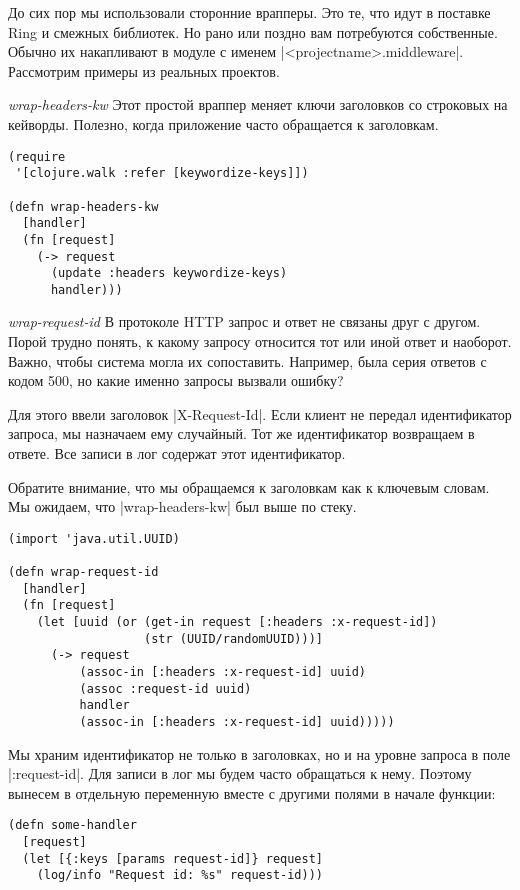 До сих пор мы использовали сторонние врапперы. Это те, что идут в поставке Ring
и смежных библиотек. Но рано или поздно вам потребуются собственные. Обычно их
накапливают в модуле с именем \spverb|<projectname>.middleware|. Рассмотрим примеры из
реальных проектов.

\emph{wrap-headers-kw} Этот простой враппер меняет ключи заголовков со строковых
на кейворды. Полезно, когда приложение часто обращается к заголовкам.

\begin{verbatim}
(require
 '[clojure.walk :refer [keywordize-keys]])

(defn wrap-headers-kw
  [handler]
  (fn [request]
    (-> request
      (update :headers keywordize-keys)
      handler)))
\end{verbatim}



\emph{wrap-request-id} В протоколе HTTP запрос и ответ не связаны друг с
другом. Порой трудно понять, к какому запросу относится тот или иной ответ и
наоборот. Важно, чтобы система могла их сопоставить. Например, была серия
ответов с кодом 500, но какие именно запросы вызвали ошибку?

Для этого ввели заголовок \spverb|X-Request-Id|. Если клиент не передал идентификатор
запроса, мы назначаем ему случайный. Тот же идентификатор возвращаем в
ответе. Все записи в лог содержат этот идентификатор.

Обратите внимание, что мы обращаемся к заголовкам как к ключевым словам. Мы
ожидаем, что \spverb|wrap-headers-kw| был выше по стеку.

\begin{verbatim}
(import 'java.util.UUID)

(defn wrap-request-id
  [handler]
  (fn [request]
    (let [uuid (or (get-in request [:headers :x-request-id])
                   (str (UUID/randomUUID)))]
      (-> request
          (assoc-in [:headers :x-request-id] uuid)
          (assoc :request-id uuid)
          handler
          (assoc-in [:headers :x-request-id] uuid)))))
\end{verbatim}

Мы храним идентификатор не только в заголовках, но и на уровне запроса в поле
\spverb|:request-id|. Для записи в лог мы будем часто обращаться к нему. Поэтому
вынесем в отдельную переменную вместе с другими полями в начале функции:

\begin{verbatim}
(defn some-handler
  [request]
  (let [{:keys [params request-id]} request]
    (log/info "Request id: %s" request-id)))
\end{verbatim}

